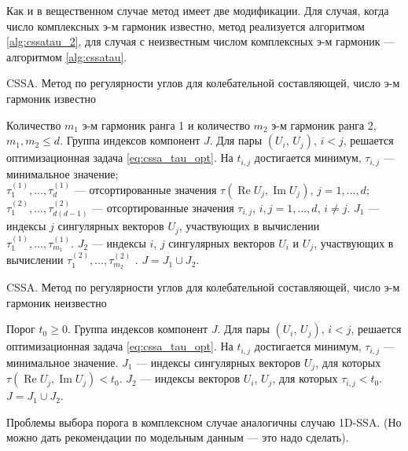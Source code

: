 \documentclass[specialist,
               substylefile = spbu.rtx,
               subf,href,colorlinks=true, 12pt]{disser}
\def\RE{\mathop{\mathrm{Re}}}
\def\IM{\mathop{\mathrm{Im}}}
\begin{document}
Как и в вещественном случае метод имеет две модификации. Для случая, когда число комплексных э-м гармоник известно, метод реализуется алгоритмом \ref{alg:cssatau_2}, для случая с неизвестным числом комплексных э-м гармоник --- алгоритмом \ref{alg:cssatau}. 

\begin{algorithm}[!hhh]
\caption{CSSA. Метод по регулярности углов для колебательной составляющей, число э-м гармоник известно}
\label{alg:cssatau_2}
\begin{algorithmic}[1]
\REQUIRE Количество $m_1$ э-м гармоник ранга 1 и количество $m_2$ э-м гармоник ранга 2,  $m_1, m_2 \leqslant d$.
\ENSURE Группа индексов компонент $J$.
\STATE Для пары $(U_i,\,U_j)$, $i<j$, решается оптимизационная задача \eqref{eq:cssa_tau_opt}.
На $t_{i,j}$ достигается минимум, $\tau_{i,j}$ --- минимальное значение;\\
$\tau_1^{(1)}, \ldots, \tau_d^{(1)}$ --- отсортированные значения $\tau(\RE U_j, \IM U_j)$, $j=1,\ldots, d$;\\
$\tau_1^{(2)}, \ldots, \tau_{d(d-1)}^{(2)}$ --- отсортированные значения $\tau_{i,j}$, $i,j=1,\ldots, d$, $i \not = j$.
\STATE  $J_1$ --- индексы $j$ сингулярных векторов $U_j$, участвующих в вычислении\\ $\tau_1^{(1)}, \ldots, \tau_{m_1}^{(1)}$.
\STATE  $J_2$ --- индексы $i$, $j$ сингулярных векторов $U_i$ и $U_j$, участвующих в вычислении $\tau_1^{(2)}, \ldots, \tau_{m_2}^{(2)}$ .
\STATE $J = J_1 \cup J_2$.
\end{algorithmic}
\end{algorithm}

\begin{algorithm}[!hhh]
\caption{CSSA. Метод по регулярности углов для колебательной составляющей, число э-м гармоник неизвестно}
\label{alg:cssatau}
\begin{algorithmic}[1]
\REQUIRE Порог $t_0 \geqslant 0$.
\ENSURE Группа индексов компонент $J$.
\STATE Для пары $(U_i,\,U_j)$, $i<j$, решается оптимизационная задача \eqref{eq:cssa_tau_opt}.
На $t_{i,j}$ достигается минимум, $\tau_{i,j}$ --- минимальное значение.
\STATE  $J_1$ --- индексы сингулярных векторов $U_j$, для которых $\tau(\RE U_j, \IM U_j) < t_0$.
\STATE  $J_2$ --- индексы векторов  $U_i$, $U_j$, для которых  $\tau_{i,j} < t_0$.
\STATE $J = J_1 \cup J_2$.
\end{algorithmic}
\end{algorithm}

Проблемы выбора порога в комплексном случае аналогичны случаю 1D-SSA.
(Но можно дать рекомендации по модельным данным --- это надо сделать).
\end{document}
